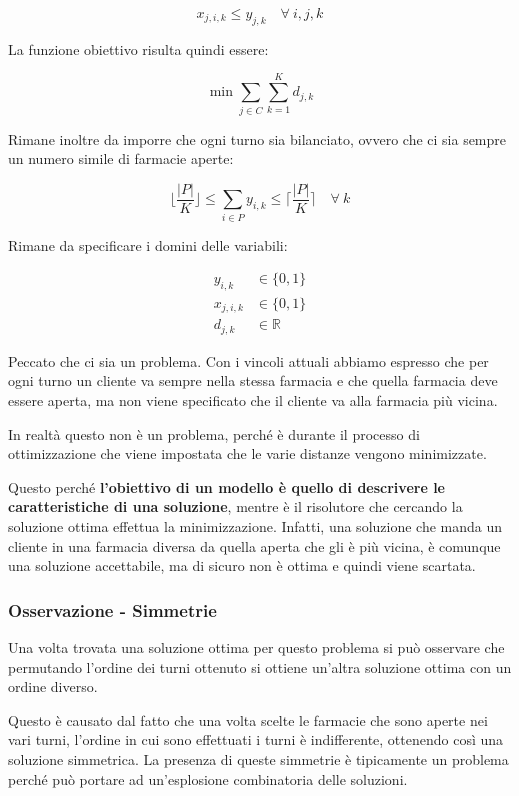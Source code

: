 $$
x_{j,i,k} \leq y_{j,k} \quad \forall \: i,j,k
$$

\noindent La funzione obiettivo risulta quindi essere:

$$
\min \sum\limits_{j \in C}\sum\limits_{k = 1}^{K} d_{j,k}
$$

\noindent Rimane inoltre da imporre che ogni turno sia bilanciato, ovvero che ci sia sempre un numero simile di farmacie aperte:

$$
\bigg\lfloor \frac{|P|}{K} \bigg\rfloor \leq \sum\limits_{i \in P} y_{i,k} \leq  \bigg\lceil \frac{|P|}{K} \bigg\rceil \quad \forall \: k
$$

\noindent Rimane da specificare i domini delle variabili:

\begin{align*}
	y_{i,k} &\in \{0,1\} \\
	x_{j,i,k} &\in \{0,1\} \\
	d_{j,k} &\in \mathbb{R}
\end{align*}

\noindent Peccato che ci sia un problema. Con i vincoli attuali abbiamo espresso che per ogni turno un cliente va sempre nella stessa farmacia e che quella farmacia deve essere aperta, ma non viene specificato che il cliente va alla farmacia più vicina.

In realtà questo non è un problema, perché è durante il processo di ottimizzazione che viene impostata che le varie distanze vengono minimizzate.

Questo perché \textbf{l'obiettivo di un modello è quello di descrivere le caratteristiche di una soluzione}, mentre è il risolutore che cercando la soluzione ottima effettua la minimizzazione. Infatti, una soluzione che manda un cliente in una farmacia diversa da quella aperta che gli è più vicina, è comunque una soluzione accettabile, ma di sicuro non è ottima e quindi viene scartata.

\subsubsection{Osservazione - Simmetrie}

Una volta trovata una soluzione ottima per questo problema si può osservare che permutando l'ordine dei turni ottenuto si ottiene un'altra soluzione ottima con un ordine diverso.

Questo è causato dal fatto che una volta scelte le farmacie che sono aperte nei vari turni, l'ordine in cui sono effettuati i turni è indifferente, ottenendo così una soluzione simmetrica. 
La presenza di queste simmetrie è tipicamente un problema perché può portare ad un'esplosione combinatoria delle soluzioni.

